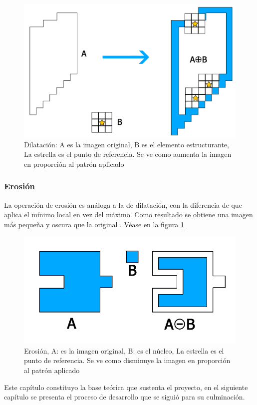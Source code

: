 \begin{figure}[hbtp]

\centering
\includegraphics[scale=0.2]{imagenes/erosion-model.jpg}
\caption{Dilatación: A es la imagen original, B es el elemento estructurante, La estrella es el punto de referencia. Se ve como aumenta la imagen en proporci\'on al patr\'on aplicado }
\end{figure}

\subsubsection{Erosión}

La operación de erosión es análoga a la de dilatación, con la diferencia de que aplica el mínimo local en vez del máximo. Como resultado se obtiene una imagen más pequeña y oscura que la original \cite{BookOpenCv}. V\'ease en la figura \ref{fig:erosion}

\begin{figure}[hbtp]
\centering
\includegraphics[scale=0.3]{imagenes/erosion.jpg}
\caption{Erosión,  A: es la imagen original, B: es el n\'ucleo, La estrella es el punto de referencia. Se ve como disminuye la imagen en proporci\'on al patr\'on aplicado}
\label{fig:erosion}
\end{figure}

Este cap\'itulo constituyo la base te\'orica que sustenta el proyecto, en el siguiente cap\'itulo se presenta el proceso de desarrollo que se sigui\'o para su culminaci\'on. 
